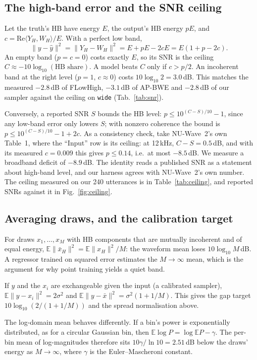 \documentclass[10pt,letterpaper]{article}
\newcommand{\E}{\mathbb{E}}
\begin{document}
\subsection{The high-band error and the SNR ceiling}\label{sec:ceiling}
Let the truth's HB have energy $E$, the output's HB energy $pE$, and $c=\mathrm{Re}\langle Y_H,W_H\rangle/E$.
With a perfect low band,
\begin{equation}
\|y-\hat y\|^2=\|Y_H-W_H\|^2=E+pE-2cE=E(1+p-2c).
\end{equation}
An empty band ($p=c=0$) costs exactly $E$, so its SNR is the ceiling $C\approx-10\log_{10}(\text{HB share})$.
A model beats $C$ only if $c>p/2$. An incoherent band at the right level ($p=1$, $c\approx0$) costs
$10\log_{10}2=3.0$\,dB. This matches the measured $-2.8$\,dB of FLowHigh, $-3.1$\,dB of AP-BWE and $-2.8$\,dB of
our sampler against the ceiling on \texttt{wide} (Tab.~\ref{tab:snr}).

Conversely, a reported SNR $S$ bounds the HB level: $p\le10^{(C-S)/10}-1$, since any low-band error only
lowers $S$; with nonzero coherence the bound is $p\le10^{(C-S)/10}-1+2c$. As a consistency check, take
NU-Wave~2's own Table~1, where the ``Input'' row is its ceiling: at 12\,kHz, $C-S=0.5$\,dB, and with its
measured $c=0.009$ this gives $p\le0.14$, i.e.\ at most $-8.5$\,dB. We measure a broadband deficit of
$-8.9$\,dB. The identity reads a published SNR as a statement about high-band level, and our harness agrees
with NU-Wave~2's own number.
The ceiling measured on our 240 utterances is in Table~\ref{tab:ceiling}, and reported SNRs against it in
Fig.~\ref{fig:ceiling}.

\subsection{Averaging draws, and the calibration target}\label{sec:avg}
For draws $x_1,\dots,x_M$ with HB components that are mutually incoherent and of equal energy,
$\E\|\bar x_H\|^2=\E\|x_H\|^2/M$: the waveform mean loses $10\log_{10}M$\,dB. A regressor trained on
squared error estimates the $M\to\infty$ mean, which is the argument for why point training yields a quiet band.

If $y$ and the $x_i$ are exchangeable given the input (a calibrated sampler),
$\E\|y-x_i\|^2=2\sigma^2$ and $\E\|y-\bar x\|^2=\sigma^2(1+1/M)$. This gives the gap target
$10\log_{10}(2/(1+1/M))$ and the spread normalisation above.

The log-domain mean behaves differently. If a bin's power is exponentially distributed, as for a circular
Gaussian bin, then $\E\log P=\log\E P-\gamma$. The per-bin mean of log-magnitudes therefore sits
$10\gamma/\ln10=2.51$\,dB below the draws' energy as $M\to\infty$, where $\gamma$ is the Euler--Mascheroni
constant.
\end{document}
